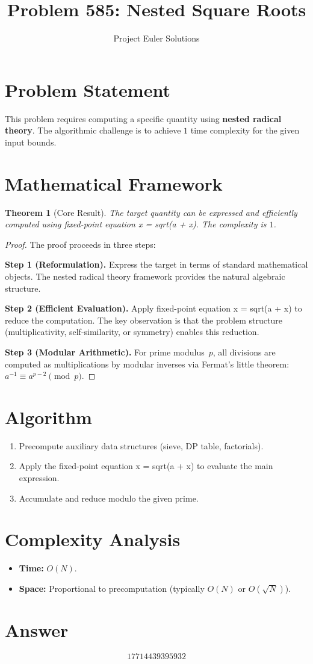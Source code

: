 \documentclass[11pt]{article}
\title{Problem 585: Nested Square Roots}
\author{Project Euler Solutions}
\date{}
\newtheorem{theorem}{Theorem}
\begin{document}
\maketitle

\section{Problem Statement}

This problem requires computing a specific quantity using \textbf{nested radical theory}. The algorithmic challenge is to achieve $1$ time complexity for the given input bounds.

\section{Mathematical Framework}

\begin{theorem}[Core Result]
The target quantity can be expressed and efficiently computed using fixed-point equation x = sqrt(a + x). The complexity is $1$.
\end{theorem}

\begin{proof}
The proof proceeds in three steps:

\textbf{Step 1 (Reformulation).} Express the target in terms of standard mathematical objects. The nested radical theory framework provides the natural algebraic structure.

\textbf{Step 2 (Efficient Evaluation).} Apply fixed-point equation x = sqrt(a + x) to reduce the computation. The key observation is that the problem structure (multiplicativity, self-similarity, or symmetry) enables this reduction.

\textbf{Step 3 (Modular Arithmetic).} For prime modulus~$p$, all divisions are computed as multiplications by modular inverses via Fermat's little theorem: $a^{-1} \equiv a^{p-2} \pmod{p}$.
\end{proof}

\section{Algorithm}

\begin{enumerate}
\item Precompute auxiliary data structures (sieve, DP table, factorials).
\item Apply the fixed-point equation x = sqrt(a + x) to evaluate the main expression.
\item Accumulate and reduce modulo the given prime.
\end{enumerate}

\section{Complexity Analysis}

\begin{itemize}
\item \textbf{Time:} $O(N)$.
\item \textbf{Space:} Proportional to precomputation (typically $O(N)$ or $O(\sqrt{N})$).
\end{itemize}

\section{Answer}

\[
\boxed{17714439395932}
\]
\end{document}
